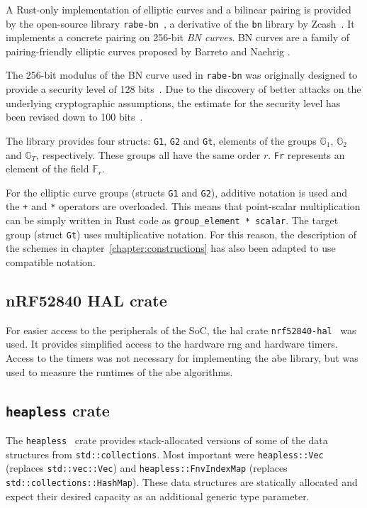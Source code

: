 A Rust-only implementation of elliptic curves and a bilinear pairing is provided by the open-source library \texttt{rabe-bn}~\cite{bowe_rabe-bn_nodate}, a derivative of the \texttt{bn} library by Zcash~\cite{bowe_bn_2016}.
It implements a concrete pairing on 256-bit \emph{BN curves}.
BN curves are a family of pairing-friendly elliptic curves proposed by Barreto and Naehrig \cite{barreto_pairing-friendly_2006}.

The 256-bit modulus of the BN curve used in \texttt{rabe-bn} was originally designed to provide a security level of 128 bits~\cite{ben-sasson_succinct_2013}. 
Due to the discovery of better attacks on the underlying cryptographic assumptions, the estimate for the security level has been revised down to 100 bits~\cite{yonezawa_pairing-friendly_2019}.

The library provides four structs: \texttt{G1}, \texttt{G2} and \texttt{Gt}, elements of the groups $\mathbb{G}_1$, $\mathbb{G}_2$ and $\mathbb{G}_T$, respectively.
These groups all have the same order $r$.
\texttt{Fr} represents an element of the \gls{field} $\mathbb{F}_r$.

For the elliptic curve groups (structs \texttt{G1} and \texttt{G2}), additive notation is used and the \texttt{+} and \texttt{*} operators are overloaded.
This means that point-scalar multiplication can be simply written in Rust code as \verb$group_element * scalar$.
The target group (struct \texttt{Gt}) uses multiplicative notation.
For this reason, the description of the schemes in chapter~\ref{chapter:constructions} has also been adapted to use compatible notation.

\subsection*{nRF52840 HAL crate}
For easier access to the peripherals of the SoC, the \acrfull{hal} \gls{crate} \texttt{nrf52840-hal}~\cite{noauthor_nrf52840-hal_nodate} was used.
It provides simplified access to the hardware \acrfull{rng} and hardware timers.
Access to the timers was not necessary for implementing the \acrshort{abe} library, but was used to measure the runtimes of the \acrshort{abe} algorithms.

\subsection*{\texttt{heapless} crate}
The \texttt{heapless}~\cite{aparicio_heapless_nodate} \gls{crate} provides stack-allocated versions of some of the data structures from \texttt{std::collections}. 
Most important were \texttt{heapless::Vec} (replaces \texttt{std::vec::Vec}) and \texttt{heapless::FnvIndexMap} (replaces \texttt{std::collections::HashMap}).
These data structures are statically allocated and expect their desired capacity as an additional generic type parameter.

